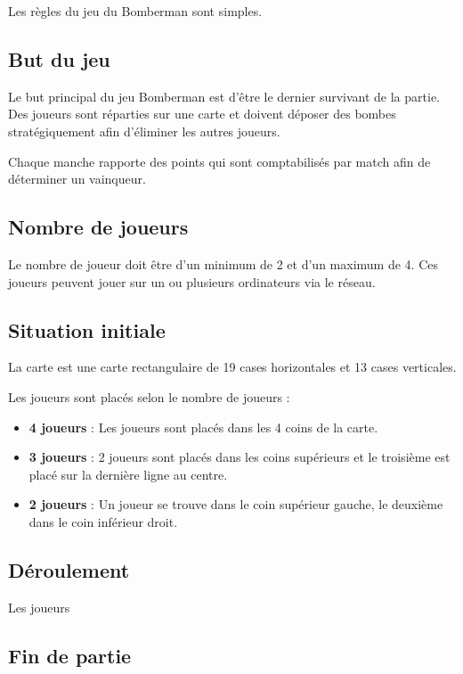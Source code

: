 Les règles du jeu du Bomberman sont simples.

\subsection{But du jeu}

Le but principal du jeu Bomberman est d'être le dernier survivant de la partie. Des joueurs sont réparties sur une carte et doivent déposer des bombes stratégiquement afin d'éliminer les autres joueurs.

Chaque manche rapporte des points qui sont comptabilisés par match afin de déterminer un vainqueur.

\subsection{Nombre de joueurs}

Le nombre de joueur doit être d'un minimum de 2 et d'un maximum de 4. Ces joueurs peuvent jouer sur un ou plusieurs ordinateurs via le réseau.

\subsection{Situation initiale}

La carte est une carte rectangulaire de 19 cases horizontales et 13 cases verticales.

Les joueurs sont placés selon le nombre de joueurs : 
\begin{itemize}
\item \textbf{4 joueurs} : Les joueurs sont placés dans les 4 coins de la carte.
\item \textbf{3 joueurs} : 2 joueurs sont placés dans les coins supérieurs et le troisième est placé sur la dernière ligne au centre.
\item \textbf{2 joueurs} : Un joueur se trouve dans le coin supérieur gauche, le deuxième dans le coin inférieur droit.
\end{itemize}

\subsection{Déroulement}

Les joueurs 

\subsection{Fin de partie}

